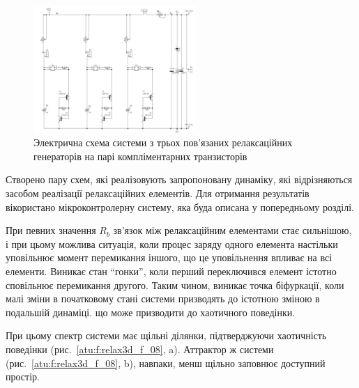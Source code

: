 \documentclass[a4paper,13pt]{atuaref}
\begin{document}

\begin{figure}[htb!]
  \centerline{\includegraphics[width=0.55\textwidth]{p7/p/relax3d_schem.png} }
  \caption{Электрична схема системи з трьох пов'язаних релаксаційних генераторів на парі компліментарних транзисторів}
  \label{atu:f:relax3d_schem}
\end{figure}


Створено пару схем,
які реалізовують запропоновану динаміку, які відрізняються
засобом реалізації релаксаційних елементів.
Для отримання результатів вікористано мікроконтролерну систему,
яка буда описана у попередньому розділі.

При певних значення $ R_b $ зв'язок між релаксаційним елементами стає сильнішою,
і при цьому можлива ситуація, коли
процес заряду одного елемента настільки уповільнює момент перемикання іншого,
що це уповільнення впливає на всі елементи. Виникає стан ``гонки'', коли
перший переключився елемент істотно сповільнює перемикання другого. Таким
чином, виникає точка біфуркації, коли малі зміни в початковому стані системи
призводять до істотною зміною в подальшій динаміці. що може призводити до
хаотичного поведінки.

При цьому спектр системи має щільні ділянки, підтверджуючи хаотичність
поведінки (рис.~\ref{atu:f:relax3d_f_08}, a). Аттрактор ж системи
(рис.~\ref{atu:f:relax3d_f_08}, b), навпаки, менш щільно заповнює
доступний простір.
\end{document}
